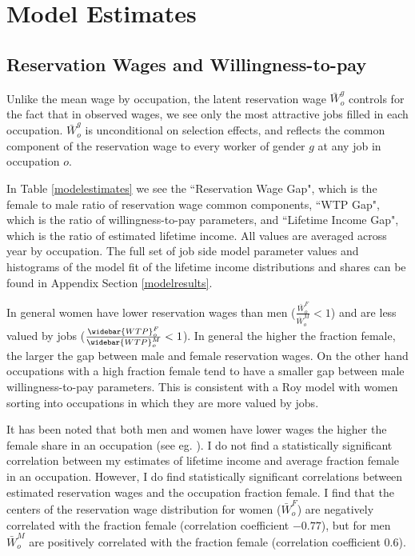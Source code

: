 \documentclass[11pt]{article}
\begin{document}




\section{Model Estimates} \label{results}
\subsection{Reservation Wages and Willingness-to-pay}
Unlike the mean wage by occupation, the latent reservation wage $\bar{W}^g_o $ controls for the fact that in observed wages, we see only the most attractive jobs filled in each occupation.  $\bar{W}^g_o $ is unconditional on selection effects, and reflects the common component of the reservation wage to every worker of gender $g$ at any job in occupation $o$. 

In Table \ref{modelestimates} we see the ``Reservation Wage Gap", which is the female to male ratio of reservation wage common components, ``WTP Gap", which is the ratio of willingness-to-pay parameters, and ``Lifetime Income Gap", which is the ratio of estimated lifetime income. All values are averaged across year by occupation. The full set of job side model parameter values and histograms of the model fit of the lifetime income distributions and shares can be found in Appendix Section \ref{modelresults}.

In general women have lower reservation wages than men ($  \frac{\bar{W}^F_o}{\bar{W}^M_o} < 1$) and are less valued by jobs ($ \frac{\widebar{WTP}^F_o}{\widebar{WTP}^M_o} < 1$). In general the higher the fraction female, the larger the gap between male and female reservation wages. On the other hand occupations with a high fraction female tend to have a smaller gap between male willingness-to-pay parameters. This is consistent with a Roy model with women sorting into occupations in which they are more valued by jobs.




It has been noted that both men and women have lower wages the higher the female share in an occupation (see eg. ). I do not find a statistically significant correlation between my estimates of lifetime income and average fraction female in an occupation. However, I do find statistically significant correlations between estimated reservation wages and the occupation fraction female. I find that the centers of the reservation wage distribution for women ($\bar{W}^F_o $) are negatively correlated with the fraction female (correlation coefficient $-0.77$), but for men $\bar{W}^M_o $ are positively correlated with the fraction female (correlation coefficient $0.6$). 
\end{document}
